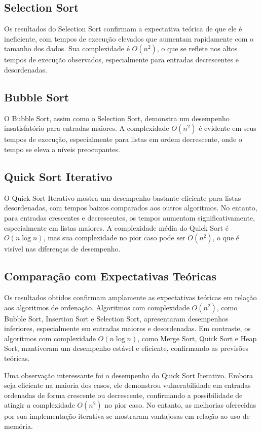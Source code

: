 \documentclass[12pt,a4paper]{article}
\begin{document}
\subsection{Selection Sort}
Os resultados do Selection Sort confirmam a expectativa teórica de que ele é ineficiente, com tempos de execução elevados que aumentam rapidamente com o tamanho dos dados. Sua complexidade é \(O(n^2)\), o que se reflete nos altos tempos de execução observados, especialmente para entradas decrescentes e desordenadas.

\subsection{Bubble Sort}
O Bubble Sort, assim como o Selection Sort, demonstra um desempenho insatisfatório para entradas maiores. A complexidade \(O(n^2)\) é evidente em seus tempos de execução, especialmente para listas em ordem decrescente, onde o tempo se eleva a níveis preocupantes.

\subsection{Quick Sort Iterativo}
O Quick Sort Iterativo mostra um desempenho bastante eficiente para listas desordenadas, com tempos baixos comparados aos outros algoritmos. No entanto, para entradas crescentes e decrescentes, os tempos aumentam significativamente, especialmente em listas maiores. A complexidade média do Quick Sort é \(O(n \log n)\), mas sua complexidade no pior caso pode ser \(O(n^2)\), o que é visível nas diferenças de desempenho.


\subsection{Comparação com Expectativas Teóricas}
Os resultados obtidos confirmam amplamente as expectativas teóricas em relação aos algoritmos de ordenação. Algoritmos com complexidade \(O(n^2)\), como Bubble Sort, Insertion Sort e Selection Sort, apresentaram desempenhos inferiores, especialmente em entradas maiores e desordenadas. Em contraste, os algoritmos com complexidade \(O(n \log n)\), como Merge Sort, Quick Sort e Heap Sort, mantiveram um desempenho estável e eficiente, confirmando as previsões teóricas.

Uma observação interessante foi o desempenho do Quick Sort Iterativo. Embora seja eficiente na maioria dos casos, ele demonstrou vulnerabilidade em entradas ordenadas de forma crescente ou decrescente, confirmando a possibilidade de atingir a complexidade \(O(n^2)\) no pior caso. No entanto, as melhorias oferecidas por sua implementação iterativa se mostraram vantajosas em relação ao uso de memória.
\end{document}
